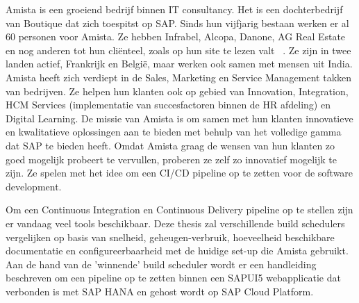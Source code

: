 Amista is een groeiend bedrijf binnen IT consultancy. Het is een dochterbedrijf van Boutique dat zich toespitst op SAP. Sinds hun vijfjarig bestaan werken er al 60 personen voor Amista. Ze hebben Infrabel, Alcopa, Danone, AG Real Estate en nog anderen tot hun cliënteel, zoals op hun site te lezen valt ~\autocite{Amista2018}.
Ze zijn in twee landen actief, Frankrijk en België, maar werken ook samen met mensen uit India.
Amista heeft zich verdiept in de Sales, Marketing en Service Management takken van bedrijven. Ze helpen hun klanten ook op gebied van Innovation, Integration, HCM Services (implementatie van succesfactoren binnen de HR afdeling) en Digital Learning.
De missie van Amista is om samen met hun klanten innovatieve en kwalitatieve oplossingen aan te bieden met behulp van het volledige gamma dat SAP te bieden heeft.
Omdat Amista graag de wensen van hun klanten zo goed mogelijk probeert te vervullen, proberen ze zelf zo innovatief mogelijk te zijn. Ze spelen met het idee om een CI/CD pipeline op te zetten voor de software development.

Om een Continuous Integration en Continuous Delivery pipeline op te stellen zijn er vandaag veel tools beschikbaar.
Deze thesis zal verschillende build schedulers vergelijken op basis van snelheid, geheugen-verbruik, hoeveelheid beschikbare documentatie en configureerbaarheid met de huidige set-up die Amista gebruikt.
Aan de hand van de 'winnende' build scheduler wordt er een handleiding beschreven om een pipeline op te zetten binnen een SAPUI5 webapplicatie dat verbonden is met SAP HANA en gehost wordt op SAP Cloud Platform.

%

